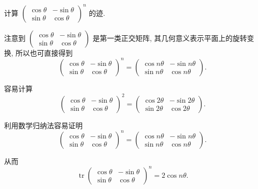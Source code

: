 \documentclass[../../main.tex]{subfiles}
\begin{document}
\begin{example}
计算 $\begin{pmatrix} \cos\theta & -\sin\theta \\ \sin\theta & \cos\theta \end{pmatrix}^n$ 的迹.
\end{example}
\begin{remark}
注意到 $\begin{pmatrix} \cos\theta & -\sin\theta \\ \sin\theta & \cos\theta \end{pmatrix}$ 是第一类正交矩阵, 其几何意义表示平面上的旋转变换, 所以也可直接得到
$$
\begin{pmatrix} \cos\theta & -\sin\theta \\ \sin\theta & \cos\theta \end{pmatrix}^n = \begin{pmatrix} \cos n\theta & -\sin n\theta \\ \sin n\theta & \cos n\theta \end{pmatrix}.
$$
\end{remark}
\begin{solution}
容易计算
$$
\begin{pmatrix} \cos\theta & -\sin\theta \\ \sin\theta & \cos\theta \end{pmatrix}^2 = \begin{pmatrix} \cos2\theta & -\sin2\theta \\ \sin2\theta & \cos2\theta \end{pmatrix}.
$$

利用数学归纳法容易证明
$$
\begin{pmatrix} \cos\theta & -\sin\theta \\ \sin\theta & \cos\theta \end{pmatrix}^n = \begin{pmatrix} \cos n\theta & -\sin n\theta \\ \sin n\theta & \cos n\theta \end{pmatrix}.
$$

从而
$$
\operatorname{tr}\begin{pmatrix} \cos\theta & -\sin\theta \\ \sin\theta & \cos\theta \end{pmatrix}^n = 2\cos n\theta.
$$
\end{solution}
\end{document}
